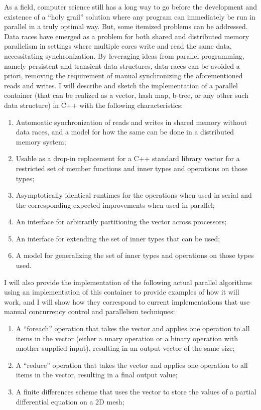 As a field, computer science still has a long way to go before the development
and existence of a ``holy grail'' solution where any program can immediately be
run in parallel in a truly optimal way. But, some itemized problems can be
addressed. Data races have emerged as a problem for both shared and distributed
memory parallelism in settings where multiple cores write and read the same
data, necessitating synchronization. By leveraging ideas from parallel
programming, namely persistent and transient data structures, data races can be
avoided a priori, removing the requirement of  manual synchronizing the
aforementioned reads and writes. I will describe and sketch the implementation
of a parallel container (that can be realized as a vector, hash map, b-tree, or
any other such data structure) in C++ with the following characteristics:
\begin{enumerate}
    \item Automoatic synchronization of reads and writes in shared memory
        without data races, and a model for how the same can be done in a
        distributed memory system;
    \item Usable as a drop-in replacement for a C++ standard library vector for
        a restricted set of member functions and inner types and operations on
        those types;
    \item Asymptotically identical runtimes for the operations when used in
        serial and the corresponding expected improvements when used in
        parallel;
    \item An interface for arbitrarily partitioning the vector across
        processors;
    \item An interface for extending the set of inner types that can be used;
    \item A model for generalizing the set of inner types and operations on
        those types used.
\end{enumerate}

I will also provide the implementation of the following actual parallel
algorithms using an implementation of this container to provide examples
of how it will work, and I will show how they correspond to current
implementations that use manual concurrency control and parallelism techniques:
\begin{enumerate}
    \item A ``foreach'' operation that takes the vector and applies one
        operation to all items in the vector (either a unary operation or a
        binary operation with another supplied input), resulting in an output
        vector of the same size;
    \item A ``reduce'' operation that takes the vector and applies one operation
        to all items in the vector, resulting in a final output value;
    \item A finite differences scheme that uses the vector to store the values
        of a partial differential equation on a 2D mesh;
\end{enumerate}

